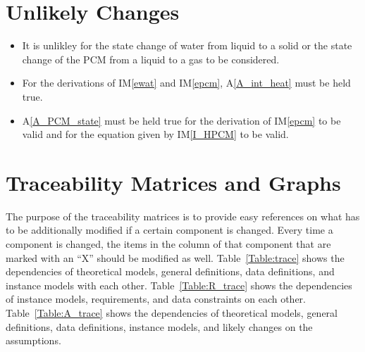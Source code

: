 \documentclass[12pt]{article}
\newcounter{ucnum}
\newcommand{\ltheucnum}{UC\theucnum}
\newcommand{\aref}[1]{A\ref{#1}}
\newcommand{\iref}[1]{IM\ref{#1}}
\begin{document}
\section{Unlikely Changes}

\begin{itemize}
\item[\refstepcounter{ucnum}\ltheucnum \label{UC_opRange}:] It is unlikley for the state change of water from liquid to a solid or the state change of the PCM from a liquid to a gas to be considered.
\item[\refstepcounter{ucnum}\ltheucnum \label{UC_intHeat}:] For the derivations of \iref{ewat} and \iref{epcm}, \aref{A_int_heat} must be held true. 
\item[\refstepcounter{ucnum}\ltheucnum \label{UC_pcmState}:] \aref{A_PCM_state} must be held true for the derivation of \iref{epcm} to be valid and for the equation given by \iref{I_HPCM} to be valid.
\end{itemize}

\section{Traceability Matrices and Graphs}

The purpose of the traceability matrices is to provide easy references on what
has to be additionally modified if a certain component is changed.  Every time a
component is changed, the items in the column of that component that are marked
with an ``X'' should be modified as well.  Table~\ref{Table:trace} shows the
dependencies of theoretical models, general definitions, data definitions, and
instance models with each other. Table~\ref{Table:R_trace} shows the
dependencies of instance models, requirements, and data constraints on each
other. Table~\ref{Table:A_trace} shows the dependencies of theoretical models,
general definitions, data definitions, instance models, and likely changes on
the assumptions.
\end{document}
